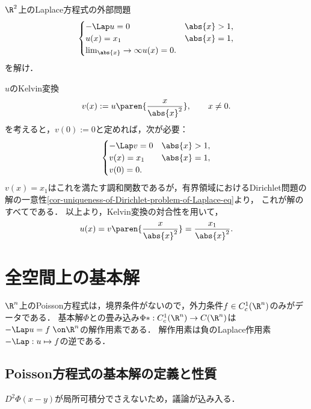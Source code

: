 \documentclass[uplatex,dvipdfmx]{jsreport}
\begin{document}
\begin{problem}
    $\R^2$上のLaplace方程式の外部問題
    \[\begin{cases}
        -\Lap u=0&\abs{x}>1,\\
        u(x)=x_1&\abs{x}=1,\\
        \lim_{\abs{x}}\to\infty u(x)=0.
    \end{cases}\]
    を解け．
\end{problem}
\begin{Proof}
    $u$のKelvin変換
    \[v(x):=u\paren{\frac{x}{\abs{x}^2}},\qquad x\ne0.\]
    を考えると，$v(0):=0$と定めれば，次が必要：
    \[\begin{cases}
        -\Lap v=0&\abs{x}>1,\\
        v(x)=x_1&\abs{x}=1,\\
        v(0)=0.
    \end{cases}\]
    $v(x)=x_1$はこれを満たす調和関数であるが，有界領域におけるDirichlet問題の解の一意性\ref{cor-uniqueness-of-Dirichlet-problem-of-Laplace-eq}より，
    これが解のすべてである．
    以上より，Kelvin変換の対合性を用いて，
    \[u(x)=v\paren{\frac{x}{\abs{x}^2}}=\frac{x_1}{\abs{x}^2}.\]
\end{Proof}

\section{全空間上の基本解}

\begin{tcolorbox}[colframe=ForestGreen, colback=ForestGreen!10!white,breakable,colbacktitle=ForestGreen!40!white,coltitle=black,fonttitle=\bfseries\sffamily,
title=]
    $\R^n$上のPoisson方程式は，境界条件がないので，外力条件$f\in C_c^1(\R^n)$のみがデータである．
    基本解$\Phi$との畳み込み$\Phi*:C_c^1(\R^n)\to C(\R^n)$は$-\Lap u=f\;\on\R^n$の解作用素である．
    解作用素は負のLaplace作用素$-\Lap:u\mapsto f$の逆である．
\end{tcolorbox}

\subsection{Poisson方程式の基本解の定義と性質}

\begin{tcolorbox}[colframe=ForestGreen, colback=ForestGreen!10!white,breakable,colbacktitle=ForestGreen!40!white,coltitle=black,fonttitle=\bfseries\sffamily,
title=]
    $D^2\Phi(x-y)$が局所可積分でさえないため，議論が込み入る．
\end{tcolorbox}
\end{document}
